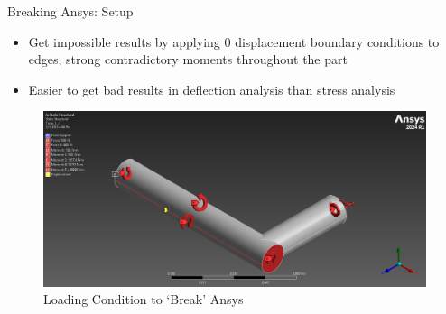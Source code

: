 \documentclass[11pt]{beamer}
\begin{document}
    
    \begin{frame}{Breaking Ansys: Setup}
        \begin{itemize}
            \item Get impossible results by applying 0 displacement boundary conditions to edges, strong contradictory moments throughout the part
            \item Easier to get bad results in deflection analysis than stress analysis
        \end{itemize}

        \begin{figure}[H]
            \vspace{-9pt}
            \includegraphics[scale=0.25]{figs/Broken_5.81E-3_All/loading_cropped.png}
            \vspace{-6pt}
            \caption{Loading Condition to `Break' Ansys}
        \end{figure}
  
    \end{frame}
\end{document}
